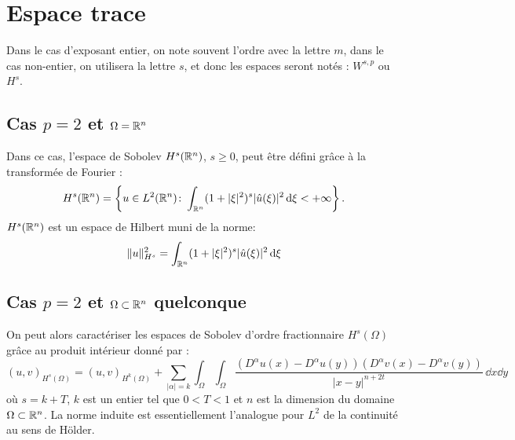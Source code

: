\medskip
\section{Espace trace}


\medskip
Dans le cas d'exposant entier, on note souvent l'ordre avec la lettre $m$,
dans le cas non-entier, on utilisera la lettre $s$, et donc les espaces seront notés : $W^{s,p}$ ou $H^s$.

\medskip
\subsection{Cas $p=2$ et $\Omega=\mathbb R^{n}$}

Dans ce cas, l'espace de Sobolev $H^{s}(\mathbb R^n)$, $s\geqslant 0$, peut être défini grâce
à la transformée de Fourier :
\begin{equation}
H^{s} (\mathbb R^n) = \left\{ u \in L^{2}(\mathbb R^n) \colon \int_{\mathbb R^n} ( 1 + | \xi |^{2 } )^{s} | \hat{u} (\xi) |^{2} \, \text{d}\xi < + \infty \right\}.
\end{equation}
$H^{s}(\mathbb R^n)$ est un espace de Hilbert muni de la norme:
\begin{equation}\| u \|_{H^{s}}^{2} = \int_{\mathbb R^n} ( 1 + | \xi |^{2 } )^{s} | \hat{u} (\xi) |^{2} \, \text{d}\xi \end{equation}

\medskip
\subsection{Cas $p=2$ et $\Omega \subset \mathbb R^{n}$ quelconque}
On peut alors caractériser les espaces de Sobolev d'ordre fractionnaire $H^s(\Omega)$
grâce au produit intérieur donné par :
\begin{equation}
(u, v)_{H^{s} (\Omega)} = (u,v)_{H^{k} (\Omega)} + \sum_{| \alpha | = k} \int_{\Omega } \int_{\Omega } \frac{( D^{\alpha }u (x) - D^{\alpha }u (y) ) (D^{\alpha }v (x) - D^{\alpha }v (y) )}{| x - y |^{n + 2 t}} \, \dd x \dd y
\end{equation}
où $s = k + T$, $k$ est un entier tel que $0 < T < 1$ et $n$ est la dimension du domaine
$\Omega \subset \mathbb R^{n}$.
La norme induite est essentiellement l'analogue pour $L^2$ de la continuité au sens de H\"older.

